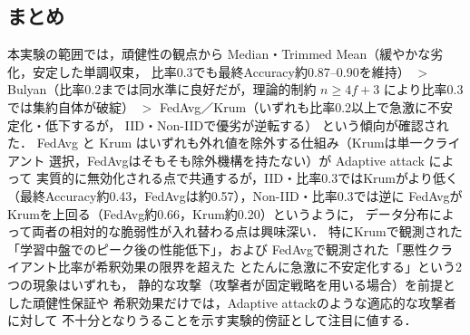 \documentclass[a4j,twocolumn,dvipdfmx]{jsarticle}
\begin{document}
\subsection{まとめ}

本実験の範囲では，頑健性の観点から
Median・Trimmed Mean（緩やかな劣化，安定した単調収束，
比率0.3でも最終Accuracy約0.87--0.90を維持）
$>$ Bulyan（比率0.2までは同水準に良好だが，理論的制約 $n \geq 4f+3$
により比率0.3では集約自体が破綻）
$>$ FedAvg／Krum（いずれも比率0.2以上で急激に不安定化・低下するが，
IID・Non-IIDで優劣が逆転する）
という傾向が確認された．
FedAvg と Krum はいずれも外れ値を除外する仕組み（Krumは単一クライアント
選択，FedAvgはそもそも除外機構を持たない）が Adaptive attack によって
実質的に無効化される点で共通するが，IID・比率0.3ではKrumがより低く
（最終Accuracy約0.43，FedAvgは約0.57），Non-IID・比率0.3では逆に
FedAvgがKrumを上回る（FedAvg約0.66，Krum約0.20）というように，
データ分布によって両者の相対的な脆弱性が入れ替わる点は興味深い．
特にKrumで観測された「学習中盤でのピーク後の性能低下」，および
FedAvgで観測された「悪性クライアント比率が希釈効果の限界を超えた
とたんに急激に不安定化する」という2つの現象はいずれも，
静的な攻撃（攻撃者が固定戦略を用いる場合）を前提とした頑健性保証や
希釈効果だけでは，Adaptive attackのような適応的な攻撃者に対して
不十分となりうることを示す実験的傍証として注目に値する．
\end{document}
